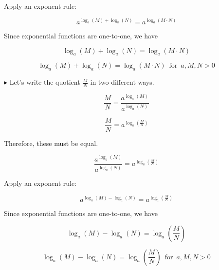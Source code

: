 \documentclass{ximera}
\begin{document}
Apply an exponent rule:


\[    a^{\log_a(M)+\log_a(N)}    =   a^{\log_a(M \cdot N)}                \]



Since exponential functions are one-to-one, we have 


\[    \log_a(M)+\log_a(N)    =   \log_a(M \cdot N)               \]




\begin{template} 

\[    \log_a(M)+\log_a(N)    =   \log_a(M \cdot N)      \, \text{ for } \, a, M, N > 0        \]


\end{template}




$\blacktriangleright$  Let's write the quotient $\frac{M}{N}$ in two different ways.



\[   \frac{M}{N} = \frac{a^{\log_a(M)}}{a^{\log_a(N)}}                    \]

\[   \frac{M}{N} = a^{\log_a\left(\frac{M}{N}\right)}                  \]


Therefore, these must be equal.


\[    \frac{a^{\log_a(M)}}{a^{\log_a(N)}}    =   a^{\log_a\left(\frac{M}{N}\right)}                \]


Apply an exponent rule:


\[    a^{\log_a(M) - \log_a(N)}    =   a^{\log_a\left(\frac{M}{N}\right)}                \]



Since exponential functions are one-to-one, we have 


\[    \log_a(M)-\log_a(N)    =   \log_a\left(\frac{M}{N}\right)             \]








\begin{template} 

\[    \log_a(M)-\log_a(N)    =   \log_a\left(\frac{M}{N}\right)        \, \text{ for } \, a, M, N > 0        \]


\end{template}
\end{document}
